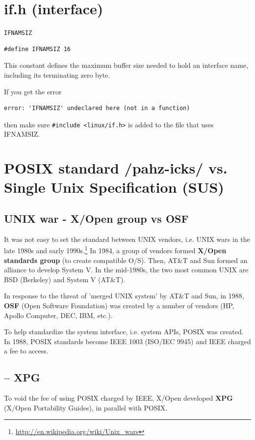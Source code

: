 \section{if.h (interface)}
\label{sec:if.h}

\verb!IFNAMSIZ!
\begin{verbatim}
#define IFNAMSIZ 16
\end{verbatim}
This constant defines the maximum buffer size needed to hold an interface name,
including its terminating zero byte.

If you get the error
\begin{verbatim}
error: 'IFNAMSIZ' undeclared here (not in a function) 
\end{verbatim}
then make sure \verb!#include <linux/if.h>! is added to the file that uses
IFNAMSIZ.

\section{POSIX standard /pahz-icks/ vs. Single Unix Specification (SUS)}

\subsection{UNIX war - X/Open group vs OSF}
\label{sec:UNIX-war}

It was not easy to set the standard between UNIX vendors, i.e. UNIX wars in the
late 1980s and early 1990s.\footnote{\url{http://en.wikipedia.org/wiki/Unix_wars}} 
In 1984, a group of vendors formed {\bf X/Open standards group} (to create
compatible O/S). Then, AT\&T and Sun formed an alliance to develop System V. 
In the mid-1980s, the two most common UNIX are BSD (Berkeley) and System V
(AT\&T).

In response to the threat of 'merged UNIX system' by AT\&T and Sun, in 1988,
{\bf OSF} (Open Software Foundation) was created by a number of vendors (HP,
Apollo Computer, DEC, IBM, etc.).

To help standardize the system interface, i.e. system APIs, POSIX was created.
In 1988, POSIX standards become IEEE 1003 (ISO/IEC 9945) and IEEE charged a fee
to access. 


\subsection{-- XPG}
\label{sec:XPG}

To void the fee of using POSIX charged by IEEE, X/Open developed {\bf XPG}
(X/Open Portability Guides), in parallel with POSIX. 

